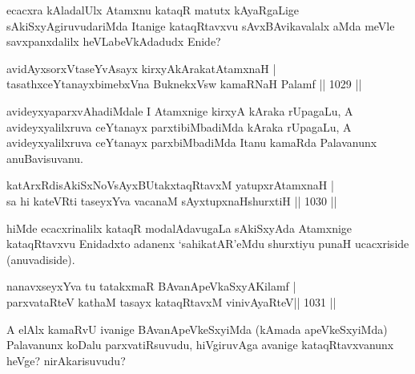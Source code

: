 \begin{artha}
ecacxra kAladalUlx Atamxnu kataqR matutx kAyaRgaLige sAkiSxyAgiruvudariMda Itanige kataqRtavxvu sAvxBAvikavalalx aMda meVle savxpanxdalilx heVLabeVkAdadudx Enide?
\end{artha}

\begin{shl}
avidAyxsorxVtaseYvAsayx kirxyAkArakatA\s \s tamxnaH | \\
tasathxceYtanayxbimebxVna BuknekxV\s sw kamaRNaH Palamf \hfill||  1029 ||  
\end{shl}

\begin{artha}
avideyxyaparxvAhadiMdale I Atamxnige kirxyA kAraka rUpagaLu, A avideyxyalilxruva ceYtanayx parxtibiMbadiMda kAraka rUpagaLu, A avideyxyalilxruva ceYtanayx parxbiMbadiMda Itanu kamaRda Palavanunx anuBavisuvanu.
\end{artha}


\begin{shl}
katArxRdisAkiSxNoV\s sAyxBUtakxtaqRtavxM yatupxrA\s \s tamxnaH | \\
sa hi kateVRti taseyxYva vacanaM sAyxtupxnaHshurxtiH \hfill||  1030 ||  
\end{shl}

\begin{artha}
hiMde ecacxrinalilx kataqR modalAdavugaLa sAkiSxyAda Atamxnige kataqRtavxvu Enidadxto adanenx `sahikatAR'eMdu shurxtiyu punaH ucacxriside (anuvadiside).
\end{artha}


\begin{shl}
nanavxseyxYva tu tatakxmaR \footnotemark[1]BAvanApeVkaSxyA\s Kilamf | \\
parxvataRteV kathaM tasayx kataqRtavxM vinivAyaRteV\hfill ||  1031 ||
\end{shl}

\begin{artha}
A elAlx kamaRvU ivanige BAvanApeVkeSxyiMda (kAmada apeVkeSxyiMda) Palavanunx koDalu parxvatiRsuvudu, hiVgiruvAga avanige kataqRtavxvanunx heVge? nirAkarisuvudu?
\end{artha}


